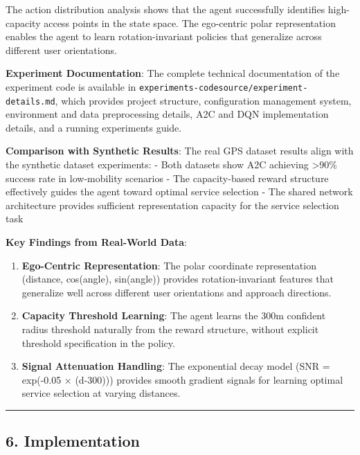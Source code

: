 \documentclass[
  10pt,
  twocolumn,
]{article}
\begin{document}
The action distribution analysis shows that the agent successfully
identifies high-capacity access points in the state space. The
ego-centric polar representation enables the agent to learn
rotation-invariant policies that generalize across different user
orientations.

\textbf{Experiment Documentation}: The complete technical documentation
of the experiment code is available in
\texttt{experiments-codesource/experiment-details.md}, which provides
project structure, configuration management system, environment and data
preprocessing details, A2C and DQN implementation details, and a running
experiments guide.

\textbf{Comparison with Synthetic Results}: The real GPS dataset results
align with the synthetic dataset experiments: - Both datasets show A2C
achieving \textgreater90\% success rate in low-mobility scenarios - The
capacity-based reward structure effectively guides the agent toward
optimal service selection - The shared network architecture provides
sufficient representation capacity for the service selection task

\textbf{Key Findings from Real-World Data}:

\begin{enumerate}
	\def\labelenumi{\arabic{enumi}.}
	\item
	      \textbf{Ego-Centric Representation}: The polar coordinate
	      representation (distance, cos(angle), sin(angle)) provides
	      rotation-invariant features that generalize well across different user
	      orientations and approach directions.
	\item
	      \textbf{Capacity Threshold Learning}: The agent learns the 300m
	      confident radius threshold naturally from the reward structure,
	      without explicit threshold specification in the policy.
	\item
	      \textbf{Signal Attenuation Handling}: The exponential decay model (SNR
	      = exp(-0.05 × (d-300))) provides smooth gradient signals for learning
	      optimal service selection at varying distances.
\end{enumerate}

\begin{center}\rule{0.5\linewidth}{0.5pt}\end{center}

\hypertarget{implementation}{%
	\subsection{6. Implementation}\label{implementation}}
\end{document}
